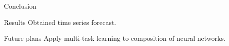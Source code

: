 \documentclass[xcolor=table]{beamer}
\begin{document}













\begin{frame}{Conclusion}

	\begin{block}{Results}
		Obtained time series forecast.
	\end{block}
	\begin{block}{Future plans}
		Apply multi-task learning to composition of neural networks.
	\end{block}

\end{frame}
\end{document}
